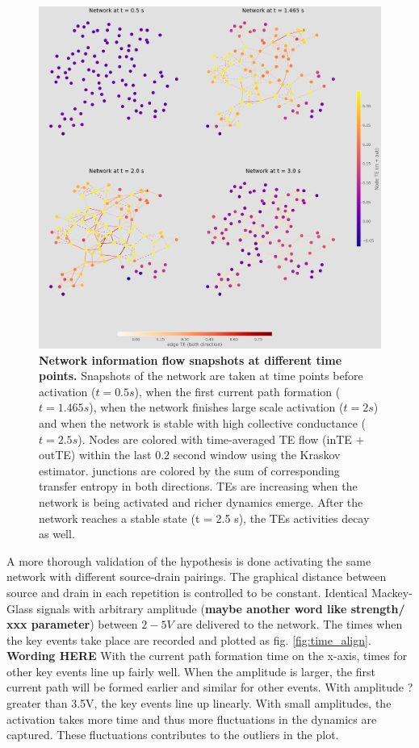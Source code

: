 \documentclass[%
 reprint,
 amsmath,amssymb,
 aps,
floatfix,
]{revtex4-2}
\begin{document}
\begin{figure}[]
	\centering
	\includegraphics[width = 0.8\paperwidth]{figure/time_network_comparison}
	\caption{\textbf{Network information flow snapshots at different time points.}
			Snapshots of the network are taken at time points before activation ($t = 0.5s$), when the first current path formation ($t=1.465s$), when the network finishes large scale activation ($t = 2s$) and when the network is stable with high collective conductance ($t = 2.5s$).
			Nodes are colored with time-averaged TE flow (inTE + outTE) within the last 0.2 second window using the Kraskov estimator. junctions are colored by the sum of corresponding transfer entropy in both directions. TEs are increasing when the network is being activated and richer dynamics emerge. After the network reaches a stable state (t = 2.5 s), the TEs activities decay as well.}
	\label{fig:network_comparison}
\end{figure}

A more thorough validation of the hypothesis is done activating the same network with different source-drain pairings. The graphical distance between source and drain in each repetition is controlled to be constant. Identical Mackey-Glass signals with arbitrary amplitude (\textbf{maybe another word like strength/ xxx parameter}) between $2-5 V$ are delivered to the network. The times when the key events take place are recorded and plotted as fig. \ref{fig:time_align}. \textbf{Wording HERE} With the current path formation time on the x-axis, times for other key events line up fairly well. When the amplitude is larger, the first current path will be formed earlier and similar for other events. With amplitude ? greater than 3.5V, the key events line up linearly. With small amplitudes, the activation takes more time and thus more fluctuations in the dynamics are captured. These fluctuations contributes to the outliers in the plot.
\end{document}
